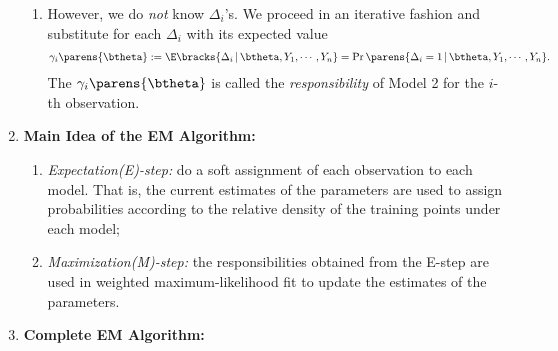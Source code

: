 \documentclass[12pt]{article}
\begin{document}
\begin{enumerate}[label=\textbf{\arabic*.}]
\begin{enumerate}
		\item However, we do \emph{not} know $\Delta_i$'s. We proceed in an iterative fashion and substitute for each $\Delta_i$ with its expected value 
		\begin{align}
			\gamma_i \parens{\btheta} := \E \bracks{\Delta_i \,\vert\, \btheta, Y_1, \cdots, Y_n} = \Pr \parens{\Delta_i = 1 \,\vert\, \btheta, Y_1, \cdots, Y_n}. 
		\end{align}
		The $\gamma_i \parens{\btheta}$ is called the \textit{responsibility} of Model 2 for the $i$-th observation. 
	\end{enumerate}
	
	\item \textbf{Main Idea of the EM Algorithm:} 
	\begin{enumerate}
		\item \textit{Expectation(E)-step:} do a soft assignment of each observation to each model. That is, the current estimates of the parameters are used to assign probabilities according to the relative density of the training points under each model; 
		\item \textit{Maximization(M)-step:} the responsibilities obtained from the E-step are used in weighted maximum-likelihood fit to update the estimates of the parameters. 
	\end{enumerate}
	
	\item \textbf{Complete EM Algorithm:}
	

\end{enumerate}
\end{document}
